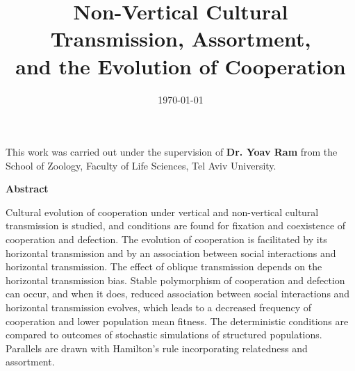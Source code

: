 \documentclass[12pt]{extarticle}
\title{Non-Vertical Cultural Transmission, Assortment, \\and the Evolution of Cooperation}
\date{\today}
\begin{document}
\maketitle


\pagebreak
{\large This work was carried out under the supervision of \textbf{Dr. Yoav Ram} from the School of Zoology, Faculty of Life Sciences, Tel Aviv University.}
\pagebreak

{\huge \begin{center} \textbf{Abstract} \end{center}}

Cultural evolution of cooperation under vertical and non-vertical cultural transmission is studied, and conditions are found for fixation and coexistence of cooperation and defection. 
The evolution of cooperation is facilitated by its horizontal transmission and by an association between social interactions and horizontal transmission.
The effect of oblique transmission depends on the horizontal transmission bias.
Stable polymorphism of cooperation and defection can occur, and
when it does, reduced association between social interactions and horizontal transmission evolves, which leads to a decreased frequency of cooperation and lower population mean fitness.
The deterministic conditions are compared to outcomes of stochastic simulations of structured populations.
Parallels are drawn with Hamilton's rule incorporating relatedness and assortment.

\pagebreak

\tableofcontents
\pagebreak


\end{document}

